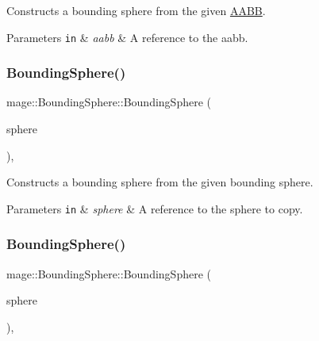 Constructs a bounding sphere from the given \mbox{\hyperlink{classmage_1_1_a_a_b_b}{A\+A\+BB}}.


\begin{DoxyParams}[1]{Parameters}
\mbox{\tt in}  & {\em aabb} & A reference to the aabb. \\
\hline
\end{DoxyParams}
\mbox{\label{classmage_1_1_bounding_sphere_aadd1c7613e09ad807d8a877c8b0906ac}} 
\subsubsection{\texorpdfstring{Bounding\+Sphere()}{BoundingSphere()}\hspace{0.1cm}{\footnotesize\ttfamily [7/8]}}
{\footnotesize\ttfamily mage\+::\+Bounding\+Sphere\+::\+Bounding\+Sphere (\begin{DoxyParamCaption}\item[{const \mbox{\hyperlink{classmage_1_1_bounding_sphere}{Bounding\+Sphere}} \&}]{sphere }\end{DoxyParamCaption})\hspace{0.3cm}{\ttfamily [default]}, {\ttfamily [noexcept]}}

Constructs a bounding sphere from the given bounding sphere.


\begin{DoxyParams}[1]{Parameters}
\mbox{\tt in}  & {\em sphere} & A reference to the sphere to copy. \\
\hline
\end{DoxyParams}
\mbox{\label{classmage_1_1_bounding_sphere_a566985b59dd05cc4545c41183338a275}} 
\subsubsection{\texorpdfstring{Bounding\+Sphere()}{BoundingSphere()}\hspace{0.1cm}{\footnotesize\ttfamily [8/8]}}
{\footnotesize\ttfamily mage\+::\+Bounding\+Sphere\+::\+Bounding\+Sphere (\begin{DoxyParamCaption}\item[{\mbox{\hyperlink{classmage_1_1_bounding_sphere}{Bounding\+Sphere}} \&\&}]{sphere }\end{DoxyParamCaption})\hspace{0.3cm}{\ttfamily [default]}, {\ttfamily [noexcept]}}

